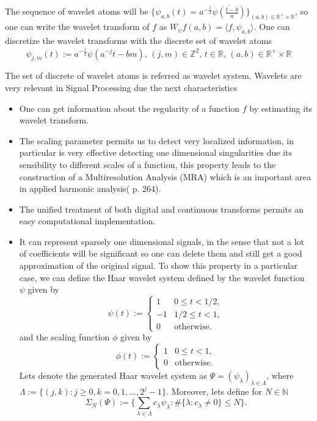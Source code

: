 \bigskip

The sequence of wavelet atoms will be $\{\psi_{a,b}(t)=a^{-\frac{1}{2}}\overline{\psi\left(\frac{t-b}{a}\right)}\}_{(a,b)\in\mathbb{R}^+\times\mathbb{R}}$, so one can write the wavelet transform of $f$ as $W_{\psi}f(a,b)=\langle f,\psi_{a,b}\rangle$. One can discretize the wavelet transforms with the discrete set of wavelet atoms
$$
\psi_{j,m}(t):=a^{-\frac{j}{2}}\psi(a^{-j}t-bm)\text{,  } (j,m)\in\mathbb{Z}^2\text{,  } t\in \mathbb{R}\text{,   }(a,b)\in\mathbb{R}^+\times\mathbb{R}
$$

The set of discrete of wavelet atoms is referred as wavelet system. Wavelets are very relevant in Signal Processing due the next characteristics 
\begin{itemize}
\item One can get information about the regularity of a function $f$ by estimating its wavelet transform.
\item The scaling parameter permits us to detect very localized information, in particular is very effective detecting one dimensional singularities due its sensibility to different scales of a function, this property leads to the construction of a Multiresolution Analysis (MRA) which is an important area in applied harmonic analysis(\cite{Mallat} p. 264).
\item The unified treatment of both digital and continuous transforms permits an easy computational implementation.
\item It can represent sparsely one dimensional signals, in the sense that not a lot of coefficients will be significant so one can delete them and still get a good approximation of the original signal. To show this property in a particular case, we can define the Haar wavelet system defined by the wavelet function $\psi$ given by
$$
\psi(t):=\begin{cases} 1 & 0\leq t<1/2, \\ -1 & 1/2\leq t<1, \\ 0 & \text{otherwise.}\end{cases}
$$
and the scaling function $\phi$ given by
$$
\phi(t):=\begin{cases} 1 & 0\leq t<1,\\ 0 & \text{otherwise.}\end{cases}
$$
Lets denote the generated Haar wavelet system as $\Psi=(\psi_{\lambda})_{\lambda\in\Lambda}$, where $\Lambda:=\{(j,k):j\geq 0, k=0,1,\ldots, 2^{j}-1\}$. Moreover, lets define for $N\in \mathbb{N}$
$$
\Sigma_{N}(\Psi):=\{\sum_{\lambda\in\Lambda}c_{\lambda}\psi_{\lambda}:\#\{\lambda :c_{\lambda}\neq 0\}\leq N\}.
$$
\end{itemize}
